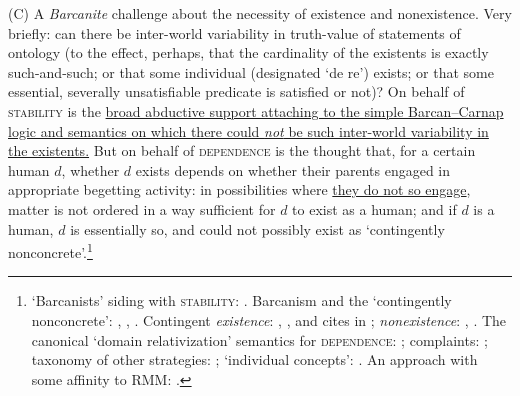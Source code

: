 \documentclass[12pt]{article}
\begin{document}
(C) A \emph{Barcanite} challenge about the necessity of existence and
nonexistence. Very briefly: can there be inter-world variability in
truth-value of statements of ontology (to the effect, perhaps, that the
cardinality of the existents is exactly such-and-such; or that some individual
(designated `de re') exists; or that some essential, severally unsatisfiable
predicate is satisfied or not)? On behalf of \textsc{stability} is the
\ul{broad abductive support attaching to the simple Barcan--Carnap 
logic and semantics on which there could \emph{not} be such inter-world
variability in the existents.} But on behalf of \textsc{dependence} is the thought that, for a
certain human $d$, whether $d$ exists depends on whether their parents engaged
in appropriate begetting activity: in possibilities where \ul{they do not so
engage}, matter
is not ordered in a way sufficient for $d$ to exist as a human; and if $d$ is
a human, $d$ is essentially so, and could not possibly exist as `contingently
nonconcrete'.\footnote{`Barcanists' siding with \textsc{stability}:
\citep{zalta88,linskyzalta94,linskyzalta96,williamson98bp,williamson13}.
Barcanism and the `contingently nonconcrete': \citep{linskyzalta96},
\citep[p.~266]{williamson98bp}, \citep{williamson13}. Contingent
\emph{existence}: \citep[p.~257]{garson84}, \citep[p.~258]{williamson98bp},
and cites in \citep[ch.~1]{williamson13}; \emph{nonexistence}:
\citep[pp.~65--6]{kripke63}, \citep[p.~258]{williamson98bp}. The canonical
`domain relativization' semantics for \textsc{dependence}:
\citep{kripke63,stalnaker94}; complaints:
\citep{garson84,Garson2005-GARUQM-2,williamson98bp,williamson13}; taxonomy of
other strategies: \citep[p.~250]{garson84}; `individual concepts':
\citep{thomason69,Garson2005-GARUQM-2}. An approach with some affinity to RMM:
\citep{fineneno}.}
\end{document}
